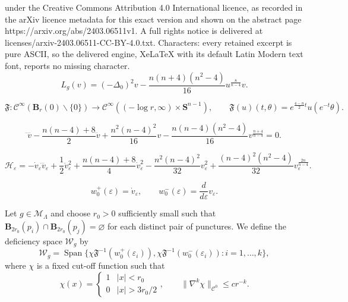 \documentclass[10pt,a4paper]{amsart}
\newcommand{\B}{\mathbf{B}}
\newcommand{\Ss}{\mathbf{S}}
\begin{document}
under the Creative Commons Attribution 4.0 International licence, as recorded in the arXiv licence metadata for this exact version and shown on the abstract page https://arxiv.org/abs/2403.06511v1. A full rights notice is delivered at licenses/arxiv-2403.06511-CC-BY-4.0.txt. Characters: every retained excerpt is pure ASCII, so the delivered engine, XeLaTeX with its default Latin Modern text font, reports no missing character.
\begin{equation} \label{lin_op_eucl} 
L_g(v)  =  (-\Delta_0)^2 v - \frac{n(n+4)(n^2-4)}{16} u^{\frac{8}{n-4}} v. 
\end{equation} 

\begin{equation} \label{emden_fowler_coords} 
\mathfrak{F} : \mathcal{C}^\infty (\B_r(0) \backslash \{ 0 \}) 
\rightarrow \mathcal{C}^\infty ((-\log r, \infty) \times \Ss^{n-1}), 
\qquad \mathfrak{F}(u) (t,\theta) = e^{\frac{4-n}{2}t} u(e^{-t}\theta). 
\end{equation} 

\begin{equation} \label{del_ode} 
\ddddot v -  \frac{n(n-4)+8}{2} \ddot v + \frac{n^2(n-4)^2}{16} 
v - \frac{n(n-4)(n^2-4)}{16} v^{\frac{n+4}{n-4}}=0. 
\end{equation} 

\begin{equation}\label{eq002}
    \mathcal{H}_\varepsilon = - \dot v_\varepsilon\dddot v_\varepsilon + \frac{1}{2} \ddot v_\varepsilon^2
+  \frac{n(n-4)+8}{4} \dot v_\varepsilon^2- \frac{n^2(n-4)^2}{32} 
v_\varepsilon^2 + \frac{(n-4)^2(n^2-4)}{32} v_\varepsilon^{\frac{2n}{n-4}}.
\end{equation}

\begin{equation} \label{geom_jac_fields}
w_0^+(\varepsilon) = \dot v_{\varepsilon} , \qquad w_0^-(\varepsilon) 
= \frac{d}{d\varepsilon}v_\varepsilon. \end{equation} 

\begin{definition} \label{deficiency_defn}
Let $g\in \mathcal{M}_\Lambda$ and choose $r_0>0$ sufficiently 
small such that $\mathbf{B}_{2r_0} (p_i) \cap \mathbf{B}_{2r_0}(p_j) 
= \varnothing$ for each distinct pair of punctures. We define the 
deficiency space $\mathcal{W}_g$ by 
$$\mathcal{W}_g = \operatorname{Span} \{ \chi \mathfrak{F}^{-1} (w_0^+(\varepsilon_i)), 
\chi \mathfrak{F}^{-1} (w_0^-(\varepsilon_i)): i=1, \dots, k\},$$
where $\chi$ is a fixed cut-off function such that 
$$\chi(x) = \left \{ \begin{array}{rl} 1 & |x| < r_0 \\ 0 & |x|> 3r_0/2 
\end{array} \right . , \qquad \|\nabla^k \chi \|_{\mathcal{C}^0} 
\leq c r^{-k}. $$
\end{definition}
\end{document}
